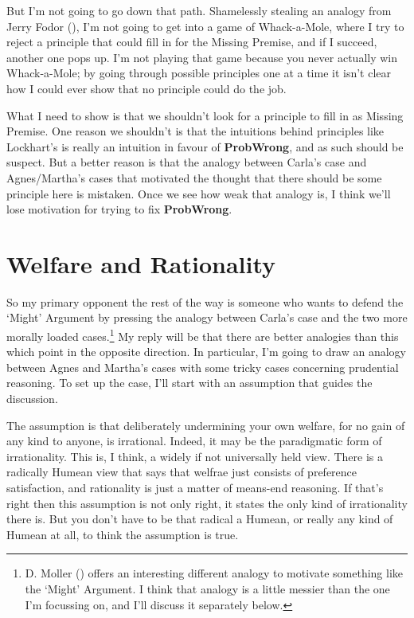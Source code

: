 \documentclass[
  11pt,
  letterpaper,
  DIV=11,
  numbers=noendperiod,
  twoside]{scrartcl}
\begin{document}
But I'm not going to go down that path. Shamelessly stealing an analogy
from Jerry Fodor (), I'm not going to get
into a game of Whack-a-Mole, where I try to reject a principle that
could fill in for the Missing Premise, and if I succeed, another one
pops up. I'm not playing that game because you never actually win
Whack-a-Mole; by going through possible principles one at a time it
isn't clear how I could ever show that no principle could do the job.

What I need to show is that we shouldn't look for a principle to fill in
as Missing Premise. One reason we shouldn't is that the intuitions
behind principles like Lockhart's is really an intuition in favour of
\textbf{ProbWrong}, and as such should be suspect. But a better reason
is that the analogy between Carla's case and Agnes/Martha's cases that
motivated the thought that there should be some principle here is
mistaken. Once we see how weak that analogy is, I think we'll lose
motivation for trying to fix \textbf{ProbWrong}.

\section{Welfare and Rationality}\label{welfareandrationality}

So my primary opponent the rest of the way is someone who wants to
defend the `Might' Argument by pressing the analogy between Carla's case
and the two more morally loaded cases.\footnote{D. Moller
  () offers an interesting different
  analogy to motivate something like the `Might' Argument. I think that
  analogy is a little messier than the one I'm focussing on, and I'll
  discuss it separately below.} My reply will be that there are better
analogies than this which point in the opposite direction. In
particular, I'm going to draw an analogy between Agnes and Martha's
cases with some tricky cases concerning prudential reasoning. To set up
the case, I'll start with an assumption that guides the discussion.

The assumption is that deliberately undermining your own welfare, for no
gain of any kind to anyone, is irrational. Indeed, it may be the
paradigmatic form of irrationality. This is, I think, a widely if not
universally held view. There is a radically Humean view that says that
welfrae just consists of preference satisfaction, and rationality is
just a matter of means-end reasoning. If that's right then this
assumption is not only right, it states the only kind of irrationality
there is. But you don't have to be that radical a Humean, or really any
kind of Humean at all, to think the assumption is true.
\end{document}
